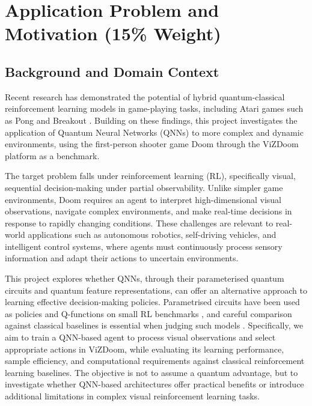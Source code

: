 \documentclass[10pt, a4paper]{article}
\begin{document}
\section{Application Problem and Motivation (15\% Weight)}
\label{sec:problem_motivation}

\subsection{Background and Domain Context}
Recent research has demonstrated the potential of hybrid quantum-classical reinforcement learning models in game-playing tasks, including Atari games such as Pong and Breakout \cite{freinberger_quantum_2024}. Building on these findings, this project investigates the application of Quantum Neural Networks (QNNs) to more complex and dynamic environments, using the first-person shooter game Doom through the ViZDoom platform \cite{kempka_vizdoom_2016} as a benchmark.

The target problem falls under reinforcement learning (RL), specifically visual, sequential decision-making under partial observability. Unlike simpler game environments, Doom requires an agent to interpret high-dimensional visual observations, navigate complex environments, and make real-time decisions in response to rapidly changing conditions. These challenges are relevant to real-world applications such as autonomous robotics, self-driving vehicles, and intelligent control systems, where agents must continuously process sensory information and adapt their actions to uncertain environments.

This project explores whether QNNs, through their parameterised quantum circuits and quantum feature representations, can offer an alternative approach to learning effective decision-making policies. Parametrised circuits have been used as policies and Q-functions on small RL benchmarks \cite{chen_vqc_drl_2020,jerbi_pqp_2021,skolik_gym_2022}, and careful comparison against classical baselines is essential when judging such models \cite{bowles_benchmark_2024}. Specifically, we aim to train a QNN-based agent to process visual observations and select appropriate actions in ViZDoom, while evaluating its learning performance, sample efficiency, and computational requirements against classical reinforcement learning baselines. The objective is not to assume a quantum advantage, but to investigate whether QNN-based architectures offer practical benefits or introduce additional limitations in complex visual reinforcement learning tasks.
\end{document}
